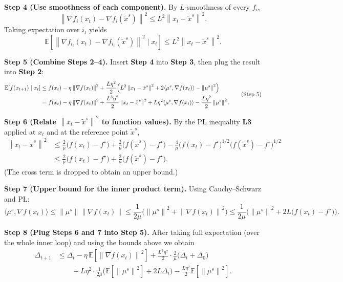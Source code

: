 \documentclass{article}
\newcommand{\E}{\mathbb{E}}
\newcommand{\norm}[1]{\left\|#1\right\|}
\newcommand{\inner}[2]{\langle #1,#2\rangle}
\newcommand{\grad}{\nabla}
\begin{document}
\bigskip
\noindent\textbf{Step 4 (Use smoothness of each component).}  
By $L$‑smoothness of every $f_i$,
\[
\norm{\grad f_i(x_t)-\grad f_i(\tilde x^{s})}^{2}
\le L^{2}\norm{x_t-\tilde x^{s}}^{2}.
\]
Taking expectation over $i_t$ yields
\[
\E\!\left[\norm{\grad f_{i_t}(x_t)-\grad f_{i_t}(\tilde x^{s})}^{2}\mid x_t\right]
\le L^{2}\norm{x_t-\tilde x^{s}}^{2}.
\tag{Step 4}
\]

\bigskip
\noindent\textbf{Step 5 (Combine Steps 2–4).}  
Insert \textbf{Step 4} into \textbf{Step 3}, then plug the result into \textbf{Step 2}:
\[
\begin{aligned}
\E\!\left[f(x_{t+1})\mid x_t\right]
&\le f(x_t)-\eta\norm{\grad f(x_t)}^{2}
   +\frac{L\eta^{2}}{2}\Bigl(
          L^{2}\norm{x_t-\tilde x^{s}}^{2}
          +2\inner{\mu^{s}}{\grad f(x_t)}-\norm{\mu^{s}}^{2}
        \Bigr)\\
&= f(x_t)-\eta\norm{\grad f(x_t)}^{2}
   +\frac{L^{3}\eta^{2}}{2}\norm{x_t-\tilde x^{s}}^{2}
   +L\eta^{2}\inner{\mu^{s}}{\grad f(x_t)}
   -\frac{L\eta^{2}}{2}\norm{\mu^{s}}^{2}.
\end{aligned}
\tag{Step 5}
\]

\bigskip
\noindent\textbf{Step 6 (Relate $\norm{x_t-\tilde x^{s}}^{2}$ to function values).}  
By the PL inequality \textbf{L3} applied at $x_t$ and at the reference point $\tilde x^{s}$,
\[
\begin{aligned}
\norm{x_t-\tilde x^{s}}^{2}
&\le \frac{2}{\mu}\bigl(f(x_t)-f^{\star}\bigr)
   +\frac{2}{\mu}\bigl(f(\tilde x^{s})-f^{\star}\bigr)
   -\frac{4}{\mu}\bigl(f(x_t)-f^{\star}\bigr)^{1/2}
          \bigl(f(\tilde x^{s})-f^{\star}\bigr)^{1/2}\\
&\le \frac{2}{\mu}\bigl(f(x_t)-f^{\star}\bigr)
   +\frac{2}{\mu}\bigl(f(\tilde x^{s})-f^{\star}\bigr).
\end{aligned}
\tag{Step 6}
\]
(The cross term is dropped to obtain an upper bound.)

\bigskip
\noindent\textbf{Step 7 (Upper bound for the inner product term).}  
Using Cauchy–Schwarz and PL:
\[
\inner{\mu^{s}}{\grad f(x_t)}
\le \norm{\mu^{s}}\norm{\grad f(x_t)}
\le \frac{1}{2\mu}\bigl(\norm{\mu^{s}}^{2}+\norm{\grad f(x_t)}^{2}\bigr)
\le \frac{1}{2\mu}\bigl(\norm{\mu^{s}}^{2}+2L\bigl(f(x_t)-f^{\star}\bigr)\bigr).
\tag{Step 7}
\]

\bigskip
\noindent\textbf{Step 8 (Plug Steps 6 and 7 into Step 5).}  
After taking full expectation (over the whole inner loop) and using the bounds above we obtain
\[
\begin{aligned}
\Delta_{t+1}
&\le \Delta_{t}
   -\eta\,\E\!\left[\norm{\grad f(x_t)}^{2}\right]
   +\frac{L^{3}\eta^{2}}{2}\cdot
        \frac{2}{\mu}\bigl(\Delta_{t}+ \Delta_{0}\bigr)\\
&\qquad
   +L\eta^{2}\cdot\frac{1}{2\mu}
        \bigl(\E[\norm{\mu^{s}}^{2}]+2L\Delta_{t}\bigr)
   -\frac{L\eta^{2}}{2}\E[\norm{\mu^{s}}^{2}] .
\end{aligned}
\tag{Step 8}
\]
\end{document}

